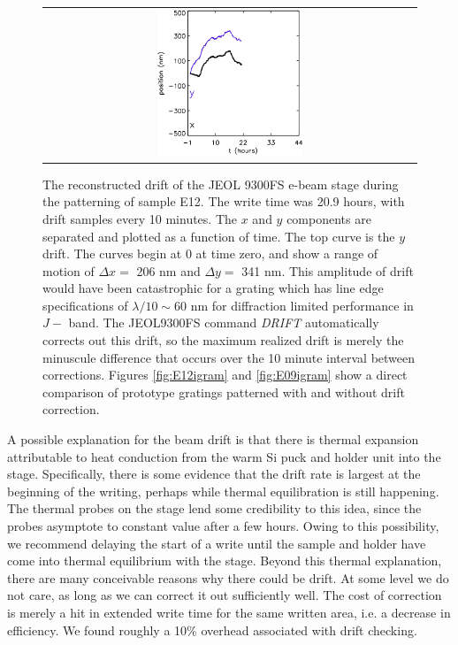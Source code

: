 \begin{figure}
\begin{center}
 \begin{tabular}{c}
    \includegraphics[width=0.4\textwidth]{chSPIE_2014_ebeam/figs/E12_drift_ebeam.png}
   \end{tabular}
  \end{center}
  \caption[Drift amplitude]{\label{fig:ebeamDrift} The reconstructed drift of the JEOL 9300FS e-beam stage during the patterning of sample E12.  The write time was 20.9 hours, with drift samples every 10 minutes.  The $x$ and $y$ components are separated and plotted as a function of time.  The top curve is the $y$ drift.  The curves begin at 0 at time zero, and show a range of motion of $\Delta x = $ 206 nm and $\Delta y = $ 341 nm.  This amplitude of drift would have been catastrophic for a grating which has line edge specifications of $\lambda/10 \sim 60 $ nm for diffraction limited performance in $J-$ band.  The JEOL9300FS command \emph{DRIFT} automatically corrects out this drift, so the maximum realized drift is merely the minuscule difference that occurs over the 10 minute interval between corrections.  Figures \ref{fig:E12igram} and \ref{fig:E09igram} show a direct comparison of prototype gratings patterned with and without drift correction.}
\end{figure}

A possible explanation for the beam drift is that there is thermal expansion attributable to heat conduction from the warm Si puck and holder unit into the stage.  Specifically, there is some evidence that the drift rate is largest at the beginning of the writing, perhaps while thermal equilibration is still happening.  The thermal probes on the stage lend some credibility to this idea, since the probes asymptote to constant value after a few hours.  Owing to this possibility, we recommend delaying the start of a write until the sample and holder have come into thermal equilibrium with the stage.  Beyond this thermal explanation, there are many conceivable reasons why there could be drift.  At some level we do not care, as long as we can correct it out sufficiently well.  The cost of correction is merely a hit in extended write time for the same written area, i.e. a decrease in efficiency.  We found roughly a 10\% overhead associated with drift checking.

